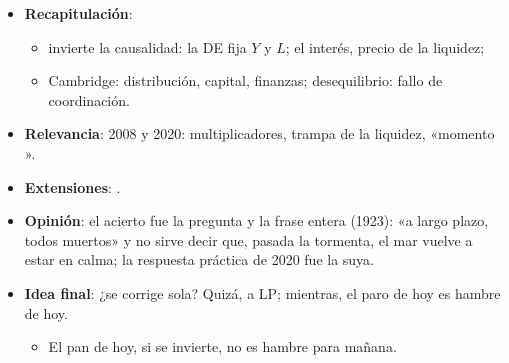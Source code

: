 \documentclass{article}
\begin{document}
\begin{columnas}
\begin{itemize}
\item \textbf{Recapitulación}:
  \begin{itemize}
  \item {} invierte la causalidad: la DE fija $Y$ y $L$; el interés, precio de la liquidez;
  \item Cambridge: distribución, capital, finanzas; desequilibrio: fallo de coordinación.
  \end{itemize}
\item \textbf{Relevancia}: 2008 y 2020: multiplicadores, trampa de la liquidez, «momento ».
\item \textbf{Extensiones}:     .
\item \textbf{Opinión}: el acierto fue la pregunta y la frase entera (1923): «a largo plazo, todos muertos» y no sirve decir que, pasada la tormenta, el mar vuelve a estar en calma; la respuesta práctica de 2020 fue la suya.
\item \textbf{Idea final}: ¿se corrige sola? Quizá, a LP; mientras, el paro de hoy es hambre de hoy.
  \begin{itemize}
  \item El pan de hoy, si se invierte, no es hambre para mañana.
  \end{itemize}
\end{itemize}


\end{columnas}
\end{document}

